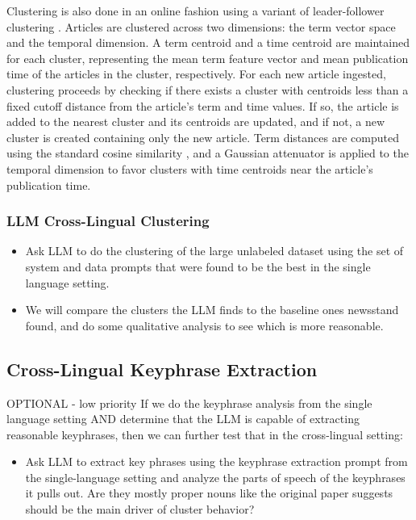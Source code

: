 Clustering is also done in an online fashion using a variant of leader-follower clustering \cite{Duda73}. Articles are clustered across two dimensions: the term vector space and the temporal dimension. A term centroid and a time centroid are maintained for each cluster, representing the mean term feature vector and mean publication time of the articles in the cluster, respectively. For each new article ingested, clustering proceeds by checking if there exists a cluster with centroids less than a fixed cutoff distance from the article's term and time values. If so, the article is added to the nearest cluster and its centroids are updated, and if not, a new cluster is created containing only the new article. Term distances are computed using the standard cosine similarity \cite{steinbach}, and a Gaussian attenuator is applied to the temporal dimension to favor clusters with time centroids near the article's publication time.


\subsubsection{LLM Cross-Lingual Clustering}

\begin{itemize}
    \item Ask LLM to do the clustering of the large unlabeled dataset using the set of system and data prompts that were found to be the best in the single language setting.
    \item We will compare the clusters the LLM finds to the baseline ones newsstand found, and do some qualitative analysis to see which is more reasonable.
\end{itemize}


\subsection{Cross-Lingual Keyphrase Extraction}
OPTIONAL - low priority
If we do the keyphrase analysis from the single language setting AND determine that the LLM is capable of extracting reasonable keyphrases, then we can further test that in the cross-lingual setting:
\begin{itemize}
    \item Ask LLM to extract key phrases using the keyphrase extraction prompt from the single-language setting and analyze the parts of speech of the keyphrases it pulls out. Are they mostly proper nouns like the original paper suggests should be the main driver of cluster behavior?
\end{itemize}



